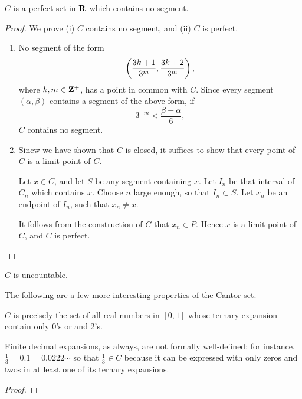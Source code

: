 \begin{proposition}
$C$ is a perfect set in $\mathbf R$ which contains no segment.
\end{proposition}

\begin{proof}
We prove (i) $C$ contains no segment, and (ii) $C$ is perfect.
\begin{enumerate}[label=(\roman*)]
\item No segment of the form
\[\left(\frac{3k+1}{3^m},\frac{3k+2}{3^m}\right),\]
where $k,m\in\mathbf Z^+$, has a point in common with $C$. Since every segment $(\alpha,\beta)$ contains a segment of the above form, if
\[3^{-m}<\frac{\beta-\alpha}{6},\]
$C$ contains no segment.

\item Sincw we have shown that $C$ is closed, it suffices to show that every point of $C$ is a limit point of $C$.

Let $x\in C$, and let $S$ be any segment containing $x$. Let $I_n$ be that interval of $C_n$ which contains $x$. Choose $n$ large enough, so that $I_n\subset S$. Let $x_n$ be an endpoint of $I_n$, such that $x_n\neq x$.

It follows from the construction of $C$ that $x_n\in P$. Hence $x$ is a limit point of $C$, and $C$ is perfect.
\end{enumerate}
\end{proof}

\begin{corollary}
$C$ is uncountable.
\end{corollary}

The following are a few more interesting properties of the Cantor set.

\begin{proposition}
$C$ is precisely the set of all real numbers in $[0,1]$ whose ternary expansion contain only $0$'s or and $2$'s.
\end{proposition}

\begin{remark}
Finite decimal expansions, as always, are not formally well-defined; for instance, $\frac{1}{3}=0.1=0.0222\cdots$ so that $\frac{1}{3}\in C$ because it can be expressed with only zeros and twos in at least one of its ternary expansions.
\end{remark}

\begin{proof}
\end{proof}

